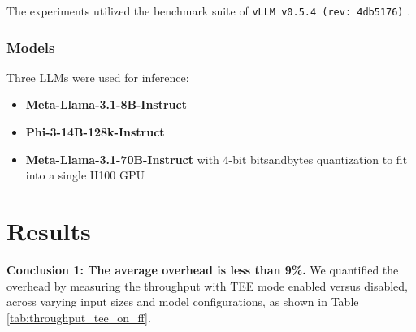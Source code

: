 \documentclass{article}
\begin{document}
The experiments utilized the benchmark suite of \texttt{vLLM v0.5.4 (rev: 4db5176)} \cite{kwon2023efficient}.

\subsubsection{Models}

Three LLMs were used for inference:

\begin{itemize}
    \item \textbf{Meta-Llama-3.1-8B-Instruct}
    \item \textbf{Phi-3-14B-128k-Instruct}
    \item \textbf{Meta-Llama-3.1-70B-Instruct} with 4-bit bitsandbytes quantization to fit into a single H100 GPU
\end{itemize}

\section{Results}

\noindent\textbf{Conclusion 1: The average overhead is less than 9\%.} We quantified the overhead by measuring the throughput with TEE mode enabled versus disabled, across varying input sizes and model configurations, as shown in Table \ref{tab:throughput_tee_on_ff}.
\end{document}
